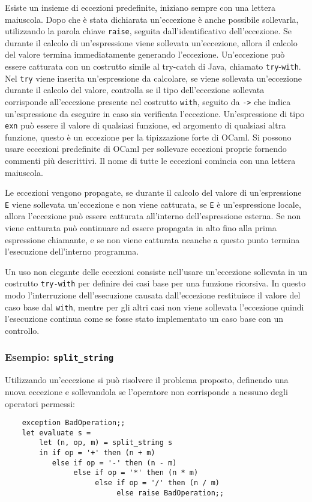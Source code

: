 \documentclass{article}
\numberwithin{equation}{subsection}
\begin{document}
Esiste un insieme di eccezioni predefinite, iniziano sempre con una lettera maiuscola. Dopo che è stata dichiarata un'eccezione è anche possibile sollevarla, utilizzando la parola chiave \verb|raise|, seguita dall'identificativo dell'eccezione. 
Se durante il calcolo di un'espressione viene sollevata un'eccezione, allora il calcolo del valore termina immediatamente generando l'eccezione. Un'eccezione può essere catturata con un costrutto simile al try-catch di Java, chiamato \verb|try|-\verb|with|. Nel \verb|try| viene inserita un'espressione da calcolare, se viene sollevata un'eccezione durante il calcolo del valore, controlla se il tipo dell'eccezione sollevata corrisponde all'eccezione presente nel costrutto \verb|with|, seguito da \verb|->| che indica un'espressione da eseguire in caso sia verificata l'eccezione. Un'espressione di tipo \verb|exn| può essere il valore di qualsiasi funzione, ed argomento di qualsiasi altra funzione, questo è un eccezione per la tipizzazione forte di OCaml. Si possono usare eccezioni predefinite di OCaml per sollevare eccezioni proprie fornendo commenti più descrittivi. Il nome di tutte le eccezioni comincia con una lettera maiuscola. 

Le eccezioni vengono propagate, se durante il calcolo del valore di un'espressione \verb|E| viene sollevata un'eccezione e non viene catturata, se \verb|E| è un'espressione locale, allora l'eccezione può essere catturata all'interno dell'espressione esterna. Se non viene catturata può continuare ad essere propagata in alto fino alla prima espressione chiamante, e se non viene catturata neanche a questo punto termina l'esecuzione dell'interno programma. 

Un uso non elegante delle eccezioni consiste nell'usare un'eccezione sollevata in un costrutto \verb|try-with| per definire dei casi base per una funzione ricorsiva. In questo modo l'interruzione dell'esecuzione causata dall'eccezione restituisce il valore del caso base dal \verb|with|, mentre per gli altri casi non viene sollevata l'eccezione quindi l'esecuzione continua come se fosse stato implementato un caso base con un controllo. 

\subsubsection{Esempio: \texttt{split\_string}}

Utilizzando un'eccezione si può risolvere il problema proposto, definendo una nuova eccezione e sollevandola se l'operatore non corrisponde a nessuno degli operatori permessi:
\begin{verbatim}
    exception BadOperation;;
    let evaluate s =
        let (n, op, m) = split_string s
        in if op = '+' then (n + m)
           else if op = '-' then (n - m)
                else if op = '*' then (n * m)
                     else if op = '/' then (n / m)
                          else raise BadOperation;;
\end{verbatim}
\end{document}
